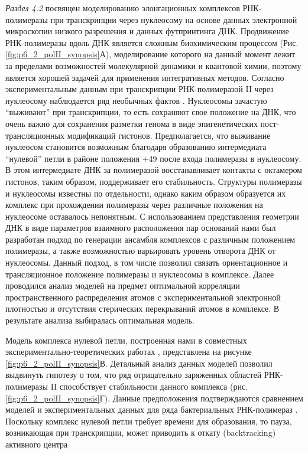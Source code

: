 \textit{Раздел 4.2} посвящен моделированию элонгационных комплексов РНК-полимеразы при транскрипции через нуклеосому на основе данных электронной микроскопии низкого разрешения и данных футпринтинга ДНК. Продвижение РНК-полимеразы вдоль ДНК является сложным биохимическим процессом (Рис. \ref{fig:p6_2_polII_synopsis}А), моделирование которого на данный момент лежит за пределами возможностей молекулярной динамики и квантовой химии, поэтому является хорошей задачей для применения интегративных методов.  Согласно экспериментальным данным при транскрипции РНК-полимеразой II через нуклеосому наблюдается ряд необычных фактов \cite{kulaeva_mechanism_2013}. Нуклеосомы зачастую ``выживают'' при транскрипции, то есть сохраняют свое положение на ДНК, что очень важно для сохранения разметки генома в виде эпигенетических пост-трансляционных модификаций гистонов. Предполагается, что выживание нуклеосом становится возможным благодаря образованию интермедиата ``нулевой'' петли в районе положения +49 после входа полимеразы в нуклеосому. В этом интермедиате ДНК за полимеразой восстанавливает контакты с октамером гистонов, таким образом, поддерживает его стабильность.
Структуры полимеразы и нуклеосомы известны по отдельности, однако каким образом образуется их комплекс при прохождении полимеразы через различные положения на нуклеосоме оставалось непонятным. С использованием представления геометрии ДНК в виде параметров взаимного расположения пар оснований нами был разработан подход по генерации ансамбля комплексов с различным положением полимеразы, а также возможностью варьировать уровень отворота ДНК от нуклеосомы. Данный подход, в том числе позволил связать ориентационное и трансляционное положение полимеразы и нуклеосомы в комплексе. Далее проводился анализ моделей на предмет оптимальной корреляции пространственного распределения атомов с экспериментальной электронной плотностью и отсутствия стерических перекрываний атомов в комплексе. В результате анализа выбиралась оптимальная модель.

Модель комплекса нулевой петли, построенная нами в совместных экспериментально-теоретических работах , представлена на рисунке \ref{fig:p6_2_polII_synopsis}В. Детальный анализ данных моделей позволил выдвинуть гипотезу о том, что ряд отрицательно заряженных областей РНК-полимеразы II способствует стабильности данного комплекса (рис. \ref{fig:p6_2_polII_synopsis}Г). Данные предположения подтверждаются сравнением моделей и экспериментальных данных для ряда бактериальных РНК-полимераз \cite{chang_analysis_2014}. Поскольку комплекс нулевой петли требует времени для образования, то пауза, возникающая при транскрипции, может приводить к откату (backtracking) активного центра 

